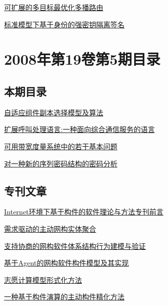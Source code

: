 \documentclass[a4paper]{article}
\begin{document}
\href{http://www.jos.org.cn/ch/reader/download_pdf.aspx?file_no=20080627&year_id=2008&quarter_id=6&falg=1}{可扩展的多目标最优化多播路由}

\href{http://www.jos.org.cn/ch/reader/download_pdf.aspx?file_no=20080628&year_id=2008&quarter_id=6&falg=1}{标准模型下基于身份的强密钥隔离签名}


\section{\textbf{2008年第19卷第5期目录}}
\subsection{本期目录}
\href{http://www.jos.org.cn/ch/reader/download_pdf.aspx?file_no=20080512&year_id=2008&quarter_id=5&falg=1}{自适应组件副本选择模型及算法}

\href{http://www.jos.org.cn/ch/reader/download_pdf.aspx?file_no=20080513&year_id=2008&quarter_id=5&falg=1}{扩展呼叫处理语言:一种面向综合通信服务的语言}

\href{http://www.jos.org.cn/ch/reader/download_pdf.aspx?file_no=20080514&year_id=2008&quarter_id=5&falg=1}{可用带宽度量系统中的若干基本问题}

\href{http://www.jos.org.cn/ch/reader/download_pdf.aspx?file_no=20080515&year_id=2008&quarter_id=5&falg=1}{对一种新的序列密码结构的密码分析}

\subsection{专刊文章}
\href{http://www.jos.org.cn/ch/reader/download_pdf.aspx?file_no=20080501&year_id=2008&quarter_id=5&falg=1}{Internet环境下基于构件的软件理论与方法专刊前言}

\href{http://www.jos.org.cn/ch/reader/download_pdf.aspx?file_no=20080502&year_id=2008&quarter_id=5&falg=1}{需求驱动的主动网构实体聚合}

\href{http://www.jos.org.cn/ch/reader/download_pdf.aspx?file_no=20080503&year_id=2008&quarter_id=5&falg=1}{支持协商的网构软件体系结构行为建模与验证}

\href{http://www.jos.org.cn/ch/reader/download_pdf.aspx?file_no=20080504&year_id=2008&quarter_id=5&falg=1}{基于Agent的网构软件构件模型及其实现}

\href{http://www.jos.org.cn/ch/reader/download_pdf.aspx?file_no=20080505&year_id=2008&quarter_id=5&falg=1}{志愿计算模型形式化方法}

\href{http://www.jos.org.cn/ch/reader/download_pdf.aspx?file_no=20080506&year_id=2008&quarter_id=5&falg=1}{一种基于构件演算的主动构件精化方法}
\end{document}

